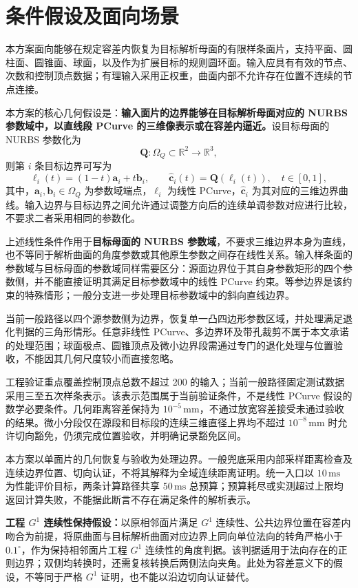 \section{条件假设及面向场景}

本方案面向能够在规定容差内恢复为目标解析母面的有限样条面片，支持平面、圆柱面、圆锥面、球面，以及作为扩展目标的规则圆环面。输入应具有有效的节点、次数和控制顶点数据；有理输入采用正权重，曲面内部不允许存在位置不连续的节点连接。

本方案的核心几何假设是：\textbf{输入面片的边界能够在目标解析母面对应的 NURBS 参数域中，以直线段 PCurve 的三维像表示或在容差内逼近。}设目标母面的 NURBS 参数化为
\[
\mathbf Q:\Omega_Q\subset\mathbb R^2\rightarrow\mathbb R^3,
\]
则第 $i$ 条目标边界可写为
\[
\boldsymbol{\ell}_i(t)=(1-t)\mathbf a_i+t\mathbf b_i,\qquad
\widehat{\mathbf c}_i(t)=\mathbf Q\!\left(\boldsymbol{\ell}_i(t)\right),
\quad t\in[0,1],
\]
其中，$\mathbf a_i,\mathbf b_i\in\Omega_Q$ 为参数域端点，$\boldsymbol{\ell}_i$ 为线性 PCurve，$\widehat{\mathbf c}_i$ 为其对应的三维边界曲线。输入边界与目标边界之间允许通过调整方向后的连续单调参数对应进行比较，不要求二者采用相同的参数化。

上述线性条件作用于\textbf{目标母面的 NURBS 参数域}，不要求三维边界本身为直线，也不等同于解析曲面的角度参数或其他原生参数之间存在线性关系。输入样条面的参数域与目标母面的参数域同样需要区分：源面边界位于其自身参数矩形的四个参数侧，并不能直接证明其满足目标参数域中的线性 PCurve 约束。等参边界是该约束的特殊情形；一般分支进一步处理目标参数域中的斜向直线边界。

当前一般路径以四个源参数侧为边界，恢复单一凸四边形参数区域，并处理满足退化判据的三角形情形。任意非线性 PCurve、多边界环及带孔裁剪不属于本文承诺的处理范围；球面极点、圆锥顶点及微小边界段需通过专门的退化处理与位置验收，不能因其几何尺度较小而直接忽略。

工程验证重点覆盖控制顶点总数不超过 200 的输入；当前一般路径固定测试数据采用三至五次样条表示。该表示范围属于当前验证条件，不是线性 PCurve 假设的数学必要条件。几何距离容差保持为 $10^{-5}\,\mathrm{mm}$，不通过放宽容差接受未通过验收的结果。微小分段仅在源段和目标段的连续三维直径上界均不超过 $10^{-8}\,\mathrm{mm}$ 时允许切向豁免，仍须完成位置验收，并明确记录豁免区间。

本方案以单面片的几何恢复与验收为处理边界。一般兜底采用内部采样距离检查及连续边界位置、切向认证，不将其解释为全域连续距离证明。统一入口以 $10\,\mathrm{ms}$ 为性能评价目标，两条计算路径共享 $50\,\mathrm{ms}$ 总预算；预算耗尽或实测超过上限均返回计算失败，不能据此断言不存在满足条件的解析表示。

\textbf{工程 $G^1$ 连续性保持假设：}以原相邻面片满足 $G^1$ 连续性、公共边界位置在容差内吻合为前提，将原曲面与目标解析曲面对应边界上同向单位法向的转角严格小于 $0.1^\circ$，作为保持相邻面片工程 $G^1$ 连续性的角度判据。该判据适用于法向存在的正则边界；双侧均转换时，还需复核转换后两侧法向夹角。此处为容差意义下的假设，不等同于严格 $G^1$ 证明，也不能以沿边切向认证替代。
